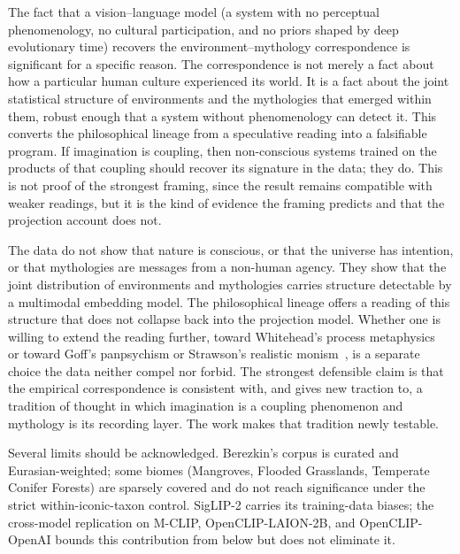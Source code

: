 \documentclass[11pt,a4paper]{article}
\begin{document}
The fact that a vision--language model (a system with no perceptual phenomenology, no cultural participation, and no priors shaped by deep evolutionary time) recovers the
environment--mythology correspondence is significant for a specific
reason. The correspondence is not merely a fact about how a particular
human culture experienced its world. It is a fact about the joint
statistical structure of environments and the mythologies that
emerged within them, robust enough that a system without phenomenology
can detect it. This converts the philosophical lineage from a
speculative reading into a falsifiable program. If imagination is
coupling, then non-conscious systems trained on the products of that
coupling should recover its signature in the data; they do. This is
not proof of the strongest framing, since the result remains compatible with weaker readings, but it is the kind of evidence the framing
predicts and that the projection account does not.

The data do not show that nature is conscious, or that the universe
has intention, or that mythologies are messages from a non-human
agency. They show that the joint distribution of environments and
mythologies carries structure detectable by a multimodal embedding
model. The philosophical lineage offers a reading of this structure
that does not collapse back into the projection model. Whether one is
willing to extend the reading further, toward Whitehead's process
metaphysics~\citep{whitehead1929process} or toward Goff's panpsychism
or Strawson's realistic
monism~\citep{goff2019galileo,strawson2006realistic}, is a
separate choice the data neither compel nor forbid. The strongest
defensible claim is that the empirical correspondence is consistent
with, and gives new traction to, a tradition of thought in which
imagination is a coupling phenomenon and mythology is its recording
layer. The work makes that tradition newly testable.

Several limits should be acknowledged. Berezkin's corpus is curated
and Eurasian-weighted; some biomes (Mangroves, Flooded Grasslands,
Temperate Conifer Forests) are sparsely covered and do not reach
significance under the strict within-iconic-taxon control. SigLIP-2
carries its training-data biases; the cross-model replication on
M-CLIP, OpenCLIP-LAION-2B, and OpenCLIP-OpenAI bounds this
contribution from below but does not eliminate it.
\end{document}
